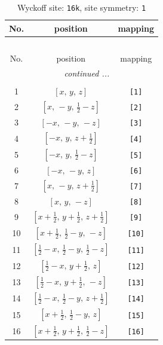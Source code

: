 \documentclass[fleqn,8pt]{jsarticle}
\begin{document}
\begin{longtable}{ccc}
\caption{Wyckoff site: {\tt 16k}, site symmetry: {\tt 1}}
 \\
 \hline \hline
No. & position & mapping \\ \hline \endfirsthead

\multicolumn{2}{l}{\tablename\ \thetable{}} \\
 \hline \hline
No. & position & mapping \\ \hline \endhead

 \hline \hline
\multicolumn{2}{r}{\footnotesize\it continued ...} \\ \endfoot

 \hline \hline
\multicolumn{2}{r}{} \\ \endlastfoot

1 & $\left[ x,\, y,\, z \right]$ & {\tt [1]} \\ \hline
2 & $\left[ x,\, - y,\, \frac{1}{2} - z \right]$ & {\tt [2]} \\ \hline
3 & $\left[ - x,\, - y,\, - z \right]$ & {\tt [3]} \\ \hline
4 & $\left[ - x,\, y,\, z + \frac{1}{2} \right]$ & {\tt [4]} \\ \hline
5 & $\left[ - x,\, y,\, \frac{1}{2} - z \right]$ & {\tt [5]} \\ \hline
6 & $\left[ - x,\, - y,\, z \right]$ & {\tt [6]} \\ \hline
7 & $\left[ x,\, - y,\, z + \frac{1}{2} \right]$ & {\tt [7]} \\ \hline
8 & $\left[ x,\, y,\, - z \right]$ & {\tt [8]} \\ \hline
9 & $\left[ x + \frac{1}{2},\, y + \frac{1}{2},\, z + \frac{1}{2} \right]$ & {\tt [9]} \\ \hline
10 & $\left[ x + \frac{1}{2},\, \frac{1}{2} - y,\, - z \right]$ & {\tt [10]} \\ \hline
11 & $\left[ \frac{1}{2} - x,\, \frac{1}{2} - y,\, \frac{1}{2} - z \right]$ & {\tt [11]} \\ \hline
12 & $\left[ \frac{1}{2} - x,\, y + \frac{1}{2},\, z \right]$ & {\tt [12]} \\ \hline
13 & $\left[ \frac{1}{2} - x,\, y + \frac{1}{2},\, - z \right]$ & {\tt [13]} \\ \hline
14 & $\left[ \frac{1}{2} - x,\, \frac{1}{2} - y,\, z + \frac{1}{2} \right]$ & {\tt [14]} \\ \hline
15 & $\left[ x + \frac{1}{2},\, \frac{1}{2} - y,\, z \right]$ & {\tt [15]} \\ \hline
16 & $\left[ x + \frac{1}{2},\, y + \frac{1}{2},\, \frac{1}{2} - z \right]$ & {\tt [16]} \\
\end{longtable}
\end{document}
